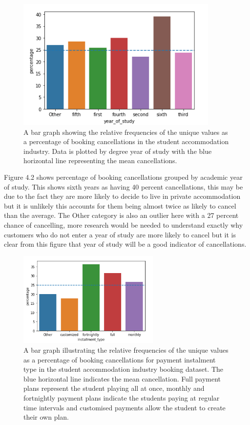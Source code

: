  
 \begin{figure}[H]
 \centering
\includegraphics[width=10cm]{figures/yos.png}
 \caption{A bar graph showing the relative frequencies of the unique values as a percentage of booking cancellations in the student accommodation industry. Data is plotted by degree year of study with the blue horizontal line representing the mean cancellations.}
\end{figure}
  
Figure 4.2 shows percentage of booking cancellations grouped by academic year of study. This shows sixth years as having 40 percent cancellations, this may be due to the fact they are more likely to decide to live in private accommodation but it is unlikely this accounts for them being almost twice as likely to cancel than the average. The Other category is also an outlier here with a 27 percent chance of cancelling, more research would be needed to understand exactly why customers who do not enter a year of study are more likely to cancel but it is clear from this figure that year of study will be a good indicator of cancellations.

\vspace{5mm}
  
  \begin{figure}[H]
 \centering
\includegraphics[width=7cm]{figures/instalment_type.png}
 \caption{A bar graph illustrating the relative frequencies of the unique values as a percentage of booking cancellations for payment instalment type in the student accommodation industry booking dataset. The blue horizontal line indicates the mean cancellation. Full payment plans represent the student playing all at once, monthly and fortnightly payment plans indicate the students paying at regular time intervals and customised payments allow the student to create their own plan. }
\end{figure}
  
